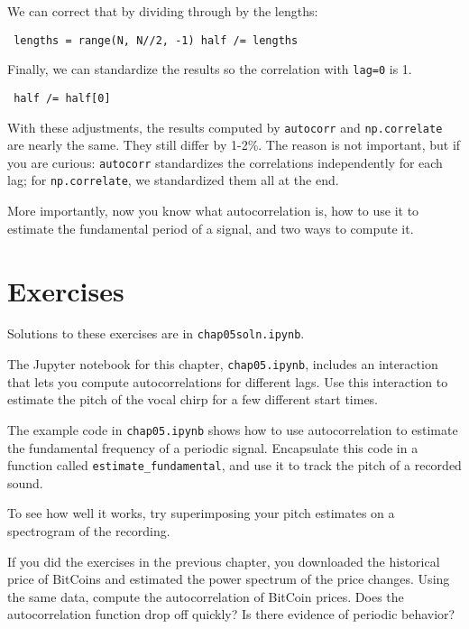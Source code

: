 \documentclass[12pt]{book} \usepackage[width=5.5in,height=8.5in, hmarginratio=3:2,vmarginratio=1:1]{geometry}
\begin{document}
We can correct that by dividing through by the lengths: 

\begin{verbatim} lengths = range(N, N//2, -1) half /= lengths \end{verbatim} 

Finally, we can standardize the results so the correlation with {\tt lag=0} is 1. 

\begin{verbatim} half /= half[0] \end{verbatim} 

With these adjustments, the results computed by {\tt autocorr} and {\tt np.correlate} are nearly the same. They still differ by 1-2\%. The reason is not important, but if you are curious: {\tt autocorr} standardizes the correlations independently for each lag; for {\tt np.correlate}, we standardized them all at the end. 

More importantly, now you know what autocorrelation is, how to use it to estimate the fundamental period of a signal, and two ways to compute it. 

\section{Exercises} 

Solutions to these exercises are in {\tt chap05soln.ipynb}. 

\begin{exercise} The Jupyter notebook for this chapter, {\tt chap05.ipynb}, includes an interaction that lets you compute autocorrelations for different lags. Use this interaction to estimate the pitch of the vocal chirp for a few different start times. \end{exercise} 

\begin{exercise} The example code in \verb"chap05.ipynb" shows how to use autocorrelation to estimate the fundamental frequency of a periodic signal. Encapsulate this code in a function called \verb"estimate_fundamental", and use it to track the pitch of a recorded sound. 

To see how well it works, try superimposing your pitch estimates on a spectrogram of the recording. \end{exercise} 

\begin{exercise} If you did the exercises in the previous chapter, you downloaded the historical price of BitCoins and estimated the power spectrum of the price changes. Using the same data, compute the autocorrelation of BitCoin prices. Does the autocorrelation function drop off quickly? Is there evidence of periodic behavior? \end{exercise} 
\end{document}
